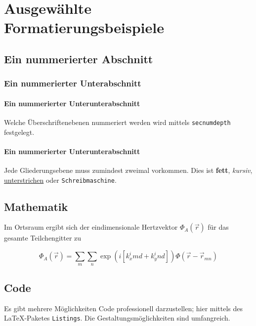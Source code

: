 \chapter{Ausgewählte Formatierungsbeispiele}

\section{Ein nummerierter Abschnitt}

\subsection{Ein nummerierter Unterabschnitt}

\subsubsection{Ein nummerierter Unterunterabschnitt}

Welche Überschriftenebenen nummeriert werden wird mittels \texttt{secnumdepth} festgelegt.

\subsubsection{Ein nummerierter Unterunterabschnitt}

Jede Gliederungsebene muss zumindest zweimal vorkommen. Dies ist \textbf{fett}, \textit{kursiv}, \underline{unterstrichen} oder \texttt{Schreibmaschine}.

\section{Mathematik}

Im Ortsraum ergibt sich der eindimensionale Hertzvektor $\Phi_A(\vec{r})$ für das gesamte Teilchengitter zu

\begin{equation}
\Phi_A(\vec{r})=\sum_m\sum_n\exp\left( i\left[ k_x^imd+k_y^ind\right] \right) \Phi\left( \vec{r}-\vec{r}_{mn}\right)
\end{equation}

\section{Code}

Es gibt mehrere Möglichkeiten Code professionell darzustellen; hier mittels des \LaTeX-Paketes \texttt{Listings}. Die Gestaltungsmöglichkeiten sind umfangreich.

